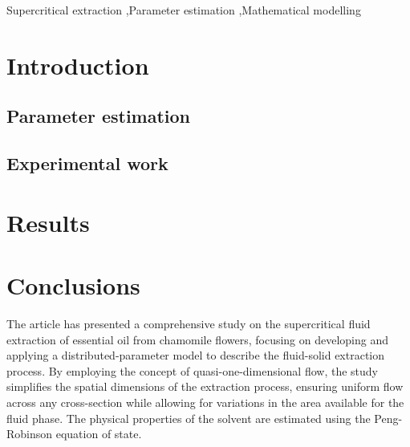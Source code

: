 \documentclass[a4paper,fleqn]{cas-dc}
\begin{document}
\begin{keywords}
Supercritical extraction \sep Parameter estimation \sep Mathematical modelling
\end{keywords}

\maketitle


\section{Introduction}




\subsection{Parameter estimation} \label{CH: Parameter_estimation}


\subsection{Experimental work}


\section{Results}


\section{Conclusions} \label{CH: Conclusion}

The article has presented a comprehensive study on the supercritical fluid extraction of essential oil from chamomile flowers, focusing on developing and applying a distributed-parameter model to describe the fluid-solid extraction process. By employing the concept of quasi-one-dimensional flow, the study simplifies the spatial dimensions of the extraction process, ensuring uniform flow across any cross-section while allowing for variations in the area available for the fluid phase. The physical properties of the solvent are estimated using the Peng-Robinson equation of state.
\end{document}
